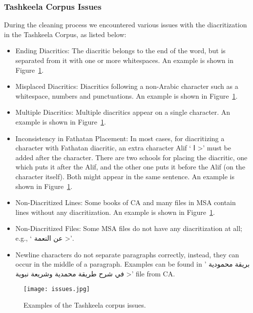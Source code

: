 \documentclass[conference]{IEEEtran}
\begin{document}
\subsubsection{Tashkeela Corpus Issues}
\label{sec:tashkeela_issues}

During the cleaning process we encountered various issues with the diacritization in the Tashkeela Corpus, as listed below:
\begin{itemize}
\item Ending Diacritics: The diacritic belongs to the end of the word, but is separated from it with one or more whitespaces. An example is shown in Figure~\ref{issues}.
    
\item Misplaced Diacritics: Diacritics following a non-Arabic character such as a whitespace, numbers and punctuations. An example is shown in Figure~\ref{issues}.

\item Multiple Diacritics: Multiple diacritics appear on a single character. An example is shown in Figure~\ref{issues}.

\item Inconsistency in Fathatan Placement: In most cases, for diacritizing a character with Fathatan diacritic, an extra character Alif
`\<
ا
>'
must be added after the character. There are two schools for placing the diacritic, one which puts it after the Alif, and the other one puts it before the Alif (on the character itself). Both might appear in the same sentence. An example is shown in Figure~\ref{issues}.

\item Non-Diacritized Lines: Some books of CA and many files in MSA contain lines without any diacritization. An example is shown in Figure~\ref{issues}.

\item Non-Diacritized Files: Some MSA files do not have any diacritization at all; e.g.,
\linebreak
`\<
عن
النعمة
>'.

\item
Newline characters do not separate paragraphs correctly, instead, they can occur in the middle of a paragraph.
Examples can be found in
'\<
بريقة محمودية في شرح طريقة محمدية وشريعة نبوية
>'
file from CA.

\end{itemize}

\begin{figure}
    \centering
    \texttt{[image: issues.jpg]}
    \caption{Examples of the Tashkeela corpus issues.}
    \label{issues}
\end{figure}
\end{document}
